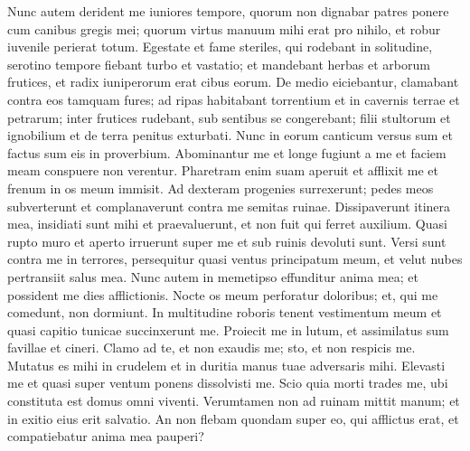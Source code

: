 \begin{biblechapter}
\begin{biblechapter}
\begin{biblechapter}
\begin{biblechapter}
\begin{biblechapter}
\begin{biblechapter}
\begin{biblechapter}
\begin{biblechapter}
\begin{biblechapter}
\begin{biblechapter}
\begin{biblechapter}
\begin{biblechapter}
\begin{biblechapter}
\begin{biblechapter}
\begin{biblechapter}
\begin{biblechapter}
\begin{biblechapter}
\begin{biblechapter}
\begin{biblechapter}
\begin{biblechapter}
\begin{biblechapter}
\begin{biblechapter}
\begin{biblechapter}
\begin{biblechapter}
\begin{biblechapter}
\begin{biblechapter}
\begin{biblechapter}
\begin{biblechapter}
\begin{biblechapter}
\begin{biblechapter}
\verse Nunc autem derident me
 iuniores tempore,
 quorum non dignabar patres
 ponere cum canibus gregis mei;
 \verse quorum virtus manuum mihi erat pro nihilo,
 et robur iuvenile perierat totum.
 \verse Egestate et fame steriles, qui rodebant in solitudine,
 serotino tempore fiebant turbo et vastatio;
 \verse et mandebant herbas et arborum frutices,
 et radix iuniperorum erat cibus eorum.
 \verse De medio eiciebantur,
 clamabant contra eos tamquam fures;
 \verse ad ripas habitabant torrentium
 et in cavernis terrae et petrarum;
 \verse inter frutices rudebant,
 sub sentibus se congerebant;
 \verse filii stultorum et ignobilium
 et de terra penitus exturbati.
 \verse Nunc in eorum canticum versus sum
 et factus sum eis in proverbium.
 \verse Abominantur me et longe fugiunt a me
 et faciem meam conspuere non verentur.
 \verse Pharetram enim suam aperuit et afflixit me
 et frenum in os meum immisit.
 \verse Ad dexteram progenies surrexerunt;
 pedes meos subverterunt
 et complanaverunt contra me semitas ruinae.
 \verse Dissipaverunt itinera mea,
 insidiati sunt mihi et praevaluerunt,
 et non fuit qui ferret auxilium.
 \verse Quasi rupto muro et aperto irruerunt super me
 et sub ruinis devoluti sunt.
 \verse Versi sunt contra me in terrores,
 persequitur quasi ventus principatum meum,
 et velut nubes pertransiit salus mea.
 \verse Nunc autem in memetipso effunditur anima mea;
 et possident me dies afflictionis.
 \verse Nocte os meum perforatur doloribus;
 et, qui me comedunt, non dormiunt.
 \verse In multitudine roboris tenent vestimentum meum
 et quasi capitio tunicae succinxerunt me.
 \verse Proiecit me in lutum,
 et assimilatus sum favillae et cineri.
 \verse Clamo ad te, et non exaudis me;
 sto, et non respicis me.
 \verse Mutatus es mihi in crudelem
 et in duritia manus tuae adversaris mihi.
 \verse Elevasti me
 et quasi super ventum ponens dissolvisti me.
 \verse Scio quia morti trades me,
 ubi constituta est domus omni viventi.
 \verse Verumtamen non ad ruinam mittit manum;
 et in exitio eius erit salvatio.
 \verse An non flebam quondam super eo, qui afflictus erat,
 et compatiebatur anima mea pauperi?

\end{biblechapter}
\end{biblechapter}
\end{biblechapter}
\end{biblechapter}
\end{biblechapter}
\end{biblechapter}
\end{biblechapter}
\end{biblechapter}
\end{biblechapter}
\end{biblechapter}
\end{biblechapter}
\end{biblechapter}
\end{biblechapter}
\end{biblechapter}
\end{biblechapter}
\end{biblechapter}
\end{biblechapter}
\end{biblechapter}
\end{biblechapter}
\end{biblechapter}
\end{biblechapter}
\end{biblechapter}
\end{biblechapter}
\end{biblechapter}
\end{biblechapter}
\end{biblechapter}
\end{biblechapter}
\end{biblechapter}
\end{biblechapter}
\end{biblechapter}
